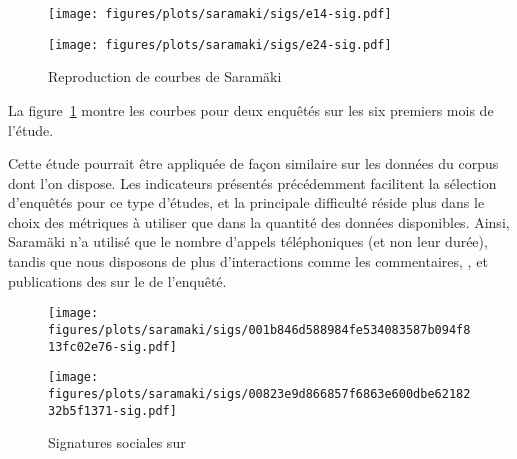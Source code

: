 \setlength{\abovecaptionskip}{0pt}
\begin{figure}[ht]
    \begin{center}
    \begin{minipage}[t]{.4\linewidth}
        \begin{center}
    \texttt{[image: figures/plots/saramaki/sigs/e14-sig.pdf]}
        \end{center}
    \end{minipage}
    \begin{minipage}[t]{.4\linewidth}
        \begin{center}
    \texttt{[image: figures/plots/saramaki/sigs/e24-sig.pdf]}
        \end{center}
    \end{minipage}
    \end{center}
    \caption{\label{fig:saramaki-repro}Reproduction de courbes de Saram\"aki}
\end{figure}
\setlength{\abovecaptionskip}{10pt}

La figure~\ref{fig:saramaki-repro} montre les courbes pour deux enquêtés sur
les six premiers mois de l’étude.

Cette étude pourrait être appliquée de façon similaire sur les données du
corpus dont l’on dispose. Les indicateurs présentés précédemment facilitent la
sélection d’enquêtés pour ce type d’études, et la principale difficulté réside
plus dans le choix des métriques à utiliser que dans la quantité des données
disponibles. Ainsi, Saram\"aki n’a utilisé que le nombre d’appels téléphoniques
(et non leur durée), tandis que nous disposons de plus d’interactions comme
les commentaires, , et publications des  sur le  de
l’enquêté.

\setlength{\abovecaptionskip}{0pt}
\begin{figure}[ht]
    \begin{center}
    \begin{minipage}[t]{.4\linewidth}
        \begin{center}
    \texttt{[image: figures/plots/saramaki/sigs/001b846d588984fe534083587b094f813fc02e76-sig.pdf]}
        \end{center}
    \end{minipage}
    \begin{minipage}[t]{.4\linewidth}
        \begin{center}
    \texttt{[image: figures/plots/saramaki/sigs/00823e9d866857f6863e600dbe6218232b5f1371-sig.pdf]}
        \end{center}
    \end{minipage}
    \end{center}
    \caption{\label{fig:saramaki-fb}Signatures sociales sur \fb{}}
\end{figure}
\setlength{\abovecaptionskip}{10pt}

